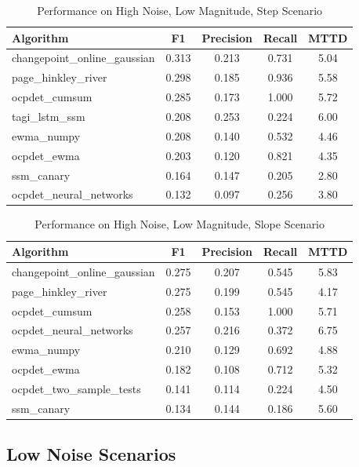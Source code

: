 \documentclass[journal,article,submit,pdftex,moreauthors]{Definitions/mdpi}
\begin{document}
\begin{table}[H]
\centering
\caption{Performance on High Noise, Low Magnitude, Step Scenario}
\label{tab:scenario_alto_bajo_escalon}
\small
\begin{tabular}{lcccc}
\toprule
\textbf{Algorithm} & \textbf{F1} & \textbf{Precision} & \textbf{Recall} & \textbf{MTTD} \\
\midrule
changepoint\_online\_gaussian & 0.313 & 0.213 & 0.731 & 5.04 \\
page\_hinkley\_river & 0.298 & 0.185 & 0.936 & 5.58 \\
ocpdet\_cumsum & 0.285 & 0.173 & 1.000 & 5.72 \\
tagi\_lstm\_ssm & 0.208 & 0.253 & 0.224 & 6.00 \\
ewma\_numpy & 0.208 & 0.140 & 0.532 & 4.46 \\
ocpdet\_ewma & 0.203 & 0.120 & 0.821 & 4.35 \\
ssm\_canary & 0.164 & 0.147 & 0.205 & 2.80 \\
ocpdet\_neural\_networks & 0.132 & 0.097 & 0.256 & 3.80 \\
\bottomrule
\end{tabular}
\end{table}

\begin{table}[H]
\centering
\caption{Performance on High Noise, Low Magnitude, Slope Scenario}
\label{tab:scenario_alto_bajo_pendiente}
\small
\begin{tabular}{lcccc}
\toprule
\textbf{Algorithm} & \textbf{F1} & \textbf{Precision} & \textbf{Recall} & \textbf{MTTD} \\
\midrule
changepoint\_online\_gaussian & 0.275 & 0.207 & 0.545 & 5.83 \\
page\_hinkley\_river & 0.275 & 0.199 & 0.545 & 4.17 \\
ocpdet\_cumsum & 0.258 & 0.153 & 1.000 & 5.71 \\
ocpdet\_neural\_networks & 0.257 & 0.216 & 0.372 & 6.75 \\
ewma\_numpy & 0.210 & 0.129 & 0.692 & 4.88 \\
ocpdet\_ewma & 0.182 & 0.108 & 0.712 & 5.32 \\
ocpdet\_two\_sample\_tests & 0.141 & 0.114 & 0.224 & 4.50 \\
ssm\_canary & 0.134 & 0.144 & 0.186 & 5.60 \\
\bottomrule
\end{tabular}
\end{table}

\subsection{Low Noise Scenarios}
\end{document}
